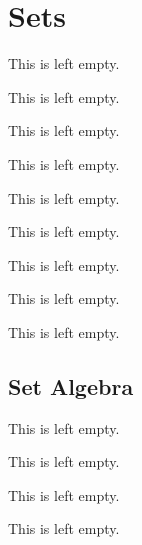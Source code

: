 \section{Sets}

\begin{definition}
    This is left empty.
\end{definition}

\begin{example}
    This is left empty.
\end{example}

\begin{example}
    This is left empty.
\end{example}

\begin{remark}
    This is left empty.
\end{remark}

\begin{definition}
    This is left empty.
\end{definition}

\begin{example}
    This is left empty.
\end{example}

\begin{definition}
    This is left empty.
\end{definition}

\begin{example}
    This is left empty.
\end{example}

\begin{remark}
    This is left empty.
\end{remark}

\subsection{Set Algebra}

\begin{example}
    This is left empty.
\end{example}

\begin{remark}
    This is left empty.
\end{remark}

\begin{definition}
    This is left empty.
\end{definition}

\begin{proposition}
    This is left empty.
\end{proposition}

